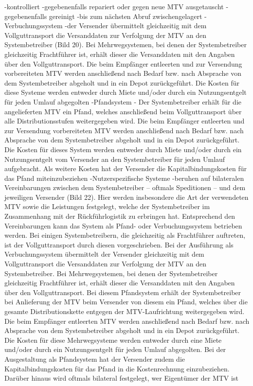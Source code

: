                             -kontrolliert
                            -gegebenenfalls repariert oder gegen neue MTV ausgetauscht
                            -gegebenenfalls gereinigt
                            -bis zum nächsten Abruf zwischengelagert
                    -Verbuchungssystem
                        -der Versender übermittelt gleichzeitig mit dem Vollguttransport die Versanddaten zur Verfolgung der MTV an den Systembetreiber (Bild 20). Bei Mehrwegsystemen, bei denen der Systembetreiber gleichzeitig Frachtführer ist, erhält dieser die Versanddaten mit den Angaben über den Vollguttransport. Die beim Empfänger entleerten und zur Versendung vorbereiteten MTV werden anschließend nach Bedarf bzw. nach Absprache von dem Systembetreiber abgeholt und in ein Depot zurückgeführt. Die Kosten für diese Systeme werden entweder durch Miete und/oder durch ein Nutzungsentgelt für jeden Umlauf abgegolten
                    -Pfandsystem
                        - Der Systembetreiber erhält für die angelieferten MTV ein Pfand, welches anschließend beim Vollguttransport über alle Distributionsstufen weitergegeben wird. Die beim Empfänger entleerten und zur Versendung vorbereiteten MTV werden anschließend nach Bedarf bzw. nach Absprache von dem Systembetreiber abgeholt und in ein Depot zurückgeführt. Die Kosten für dieses System werden entweder durch Miete und/oder durch ein Nutzungsentgelt vom Versender an den Systembetreiber für jeden Umlauf aufgebracht. Als weitere Kosten hat der Versender die Kapitalbindungskosten für das Pfand miteinzubeziehen 
                    -Nutzerspezifische Systeme
                        -beruhen auf bilateralen Vereinbarungen zwischen dem Systembetreiber – oftmals Speditionen – und dem jeweiligen Versender (Bild 22). Hier werden insbesondere die Art der verwendeten MTV sowie die Leistungen festgelegt, welche der Systembetreiber im Zusammenhang mit der Rückführlogistik zu erbringen hat. Entsprechend den Vereinbarungen kann das System als Pfand- oder Verbuchungssystem betrieben werden. Bei einigen Systembetreibern, die gleichzeitig als Frachtführer auftreten, ist der Vollguttransport durch diesen vorgeschrieben. Bei der Ausführung als Verbuchungssystem übermittelt der Versender gleichzeitig mit dem Vollguttransport die Versanddaten zur Verfolgung der MTV an den Systembetreiber. Bei Mehrwegsystemen, bei denen der Systembetreiber gleichzeitig Frachtführer ist, erhält dieser die Versanddaten mit den Angaben über den Vollguttransport. Bei diesem Pfandsystem erhält der Systembetreiber bei Anlieferung der MTV beim Versender von diesem ein Pfand, welches über die gesamte Distributionskette entgegen der MTV-Laufrichtung weitergegeben wird. Die beim Empfänger entleerten MTV werden anschließend nach Bedarf bzw. nach Absprache von dem Systembetreiber abgeholt und in ein Depot zurückgeführt. Die Kosten für diese Mehrwegsysteme werden entweder durch eine Miete und/oder durch ein Nutzungsentgelt für jeden Umlauf abgegolten. Bei der Ausgestaltung als Pfandsystem hat der Versender zudem die Kapitalbindungskosten für das Pfand in die Kostenrechnung einzubeziehen. Darüber hinaus wird oftmals bilateral festgelegt, wer Eigentümer der MTV ist

